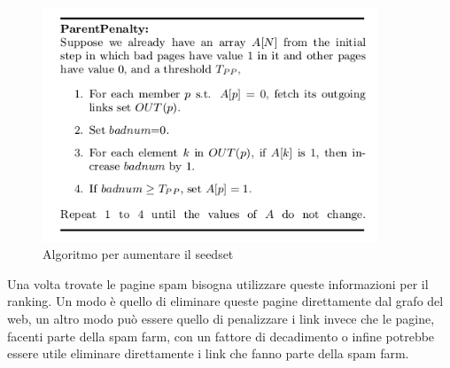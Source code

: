 \begin{figure}
\centering
\includegraphics[height=7cm]{immagini/linkfarm/immagine2.png}
\caption{Algoritmo per aumentare il seedset}
\label{fig:linkfarm2}
\end{figure}
Una volta trovate le pagine spam bisogna utilizzare queste informazioni per il ranking. Un modo è quello di eliminare queste pagine direttamente dal grafo del web, un altro modo può essere quello di penalizzare i link invece che le pagine, facenti parte della spam farm, con un fattore di decadimento o infine potrebbe essere utile eliminare direttamente i link che fanno parte della spam farm.

